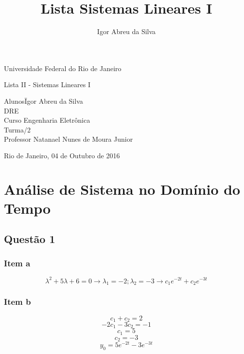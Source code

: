 \documentclass[a4paper, 12pt]{article}
\author{Igor Abreu da Silva}
\title{Lista Sistemas Lineares I}
\begin{document}
    \begin{titlepage}
        \begin{center}
            \huge{Universidade Federal do Rio de Janeiro}
            \vspace{95pt}

            \large{Lista II - Sistemas Lineares I}
            \vspace{160pt}
        \end{center}

        \begin{flushleft}
            \begin{tabbing}
                Alunos\qquad\qquad\= Igor Abreu da Silva\\
                DRE \\
                Curso\> Engenharia Eletrônica \\
                Turma/2 \\
                Professor\> Natanael Nunes de Moura Junior \\

            \end{tabbing}

        \end{flushleft}

        \begin{center}
            \vspace{\fill}
            Rio de Janeiro, 04 de Outubro de 2016
        \end{center}
    \end{titlepage}

    \newpage
    \tableofcontents
    \listoffigures
    \thispagestyle{empty}
    \newpage
    
    \section{An\'{a}lise de Sistema no Dom\'{i}nio do Tempo}
    \subsection{Quest\~{a}o 1}
    \subsubsection{Item a}
    \[\lambda^{2} + 5\lambda + 6 = 0 \rightarrow \lambda_{1} = -2; \lambda_{2} = -3 \rightarrow c_{1}e^{-2t} + c_{2}e^{-3t}\]
    \subsubsection{Item b}
    \[c_{1} + c_{2} = 2 \]
    \[-2c_{1} -3c_{2} = -1 \]
    \[c_{1} =  5\]
    \[c_{2} =  -3\]    
    \[y_{0} = 5e^{-2t} -3e^{-3t} \]
\end{document}
